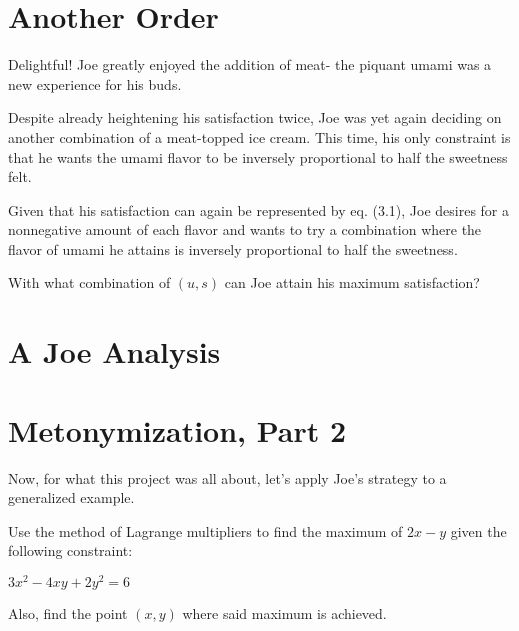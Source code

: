\setcounter{chapter}{5}
\chapter{Another Order} %
Delightful! Joe greatly enjoyed the addition of meat- the piquant umami was a new experience for his buds.

Despite already heightening his satisfaction twice, Joe was yet again deciding on another combination of a meat-topped ice cream.
This time, his only constraint is that he wants the umami flavor to be inversely proportional to half the sweetness felt.
\begin{eg} %
	Given that his satisfaction can again be represented by eq. (3.1), Joe desires for a nonnegative amount of each flavor and wants to try a combination where the flavor of umami he attains is inversely proportional to half the sweetness.

	With what combination of $(u, s)$ can Joe attain his maximum satisfaction?
\end{eg}
\setcounter{chapter}{6}
\chapter{A Joe Analysis}
\setcounter{chapter}{7}
\chapter{Metonymization, Part 2} %
Now, for what this project was all about, let's apply Joe's strategy to a generalized example.
\begin{eg}
	Use the method of Lagrange multipliers to find the maximum of $2x-y$ given the following constraint:
	\begin{center}
		$3x^2-4xy+2y^2=6$
	\end{center}
	Also, find the point $(x, y)$ where said maximum is achieved.
\end{eg}
